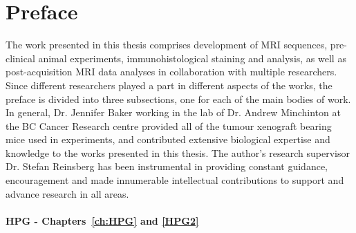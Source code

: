 
\chapter{Preface}
\label{ch:preface}
The work presented in this thesis comprises development of MRI sequences, pre-clinical animal experiments, immunohistological staining and analysis, as well as post-acquisition MRI data analyses in collaboration with multiple researchers.
Since different researchers played a part in different aspects of the works, the preface is divided into three subsections, one for each of the main bodies of work.
In general, Dr. Jennifer Baker working in the lab of Dr. Andrew Minchinton at the BC Cancer Research centre provided all of the tumour xenograft bearing mice used in experiments, and contributed extensive biological expertise and knowledge to the works presented in this thesis.
The author's research supervisor Dr. Stefan Reinsberg has been instrumental in providing constant guidance, encouragement and made innumerable intellectual contributions to support and advance research in all areas.

%

\subsubsection{HPG - Chapters~\ref{ch:HPG} and \ref{HPG2}}

